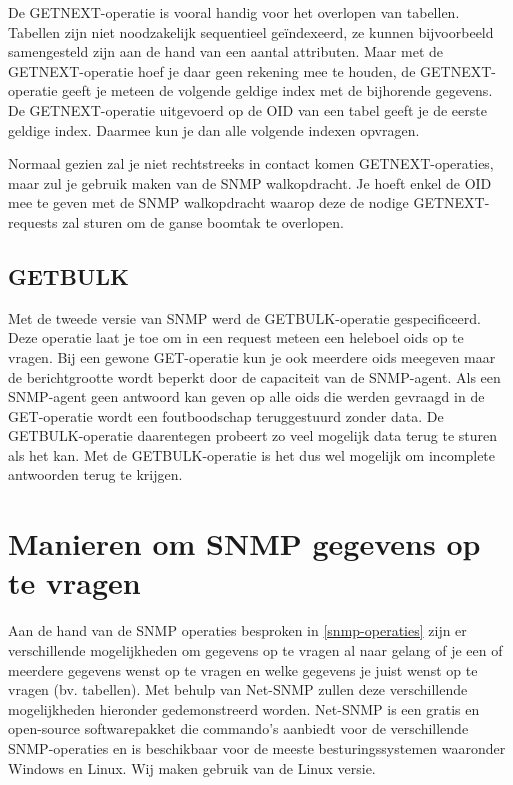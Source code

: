 De GETNEXT-operatie is vooral handig voor het overlopen van tabellen.
Tabellen zijn niet noodzakelijk sequentieel geïndexeerd, ze kunnen bijvoorbeeld samengesteld zijn aan de hand van een aantal attributen.
Maar met de GETNEXT-operatie hoef je daar geen rekening mee te houden, de GETNEXT-operatie geeft je meteen de volgende geldige index met de bijhorende gegevens.
De GETNEXT-operatie uitgevoerd op de OID van een tabel geeft je de eerste geldige index.
Daarmee kun je dan alle volgende indexen opvragen.

Normaal gezien zal je niet rechtstreeks in contact komen GETNEXT-operaties, maar zul je gebruik maken van de SNMP walkopdracht.
Je hoeft enkel de OID mee te geven met de SNMP walkopdracht waarop deze de nodige GETNEXT-requests zal sturen om de ganse boomtak te overlopen.



\subsection{GETBULK}
Met de tweede versie van SNMP werd de GETBULK-operatie gespecificeerd.
Deze operatie laat je toe om in een request meteen een heleboel \glspl{oid} op te vragen.
Bij een gewone GET-operatie kun je ook meerdere \glspl{oid} meegeven maar de berichtgrootte wordt beperkt door de capaciteit van de SNMP-agent.
Als een SNMP-agent geen antwoord kan geven op alle \glspl{oid} die werden gevraagd in de GET-operatie wordt een foutboodschap teruggestuurd zonder data.
De GETBULK-operatie daarentegen probeert zo veel mogelijk data terug te sturen als het kan.
Met de GETBULK-operatie is het dus wel mogelijk om incomplete antwoorden terug te krijgen.\cite{essentialsnmp}

\section{Manieren om SNMP gegevens op te vragen}
\label{manieren-om-snmp-gegevens-op-te-vragen}

Aan de hand van de SNMP operaties besproken in \cref{snmp-operaties} zijn er verschillende mogelijkheden om gegevens op te vragen
al naar gelang of je een of meerdere gegevens wenst op te vragen en welke gegevens je juist wenst op te vragen (bv. tabellen).
Met behulp van Net-SNMP zullen deze verschillende mogelijkheden hieronder gedemonstreerd worden.
Net-SNMP is een gratis en open-source softwarepakket die commando's aanbiedt voor de verschillende SNMP-operaties en
is beschikbaar voor de meeste besturingssystemen waaronder Windows en Linux.
Wij maken gebruik van de Linux versie.


